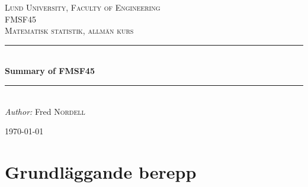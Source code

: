 \documentclass[12pt]{article} %
\begin{document}

\begin{titlepage}

\newcommand{\HRule}{\rule{\linewidth}{0.5mm}} %

\center %

\textsc{\LARGE Lund University, Faculty of Engineering}\\[1.5cm] %
\textsc{\Large FMSF45}\\[0.5cm] %
\textsc{\large Matematisk statistik, allmän kurs}\\[0.5cm] %

\HRule \\[1cm]
{ \huge \bfseries Summary of FMSF45}\\[0.4cm] %
\HRule \\[1.5cm]

\emph{Author:} Fred \textsc{Nordell} %

{\large \today}\\[3cm] %


\vfill %

\end{titlepage}


\tableofcontents %
\lstlistoflistings %
\listoffigures %
\listoftables %

\newpage %


\section{Grundläggande berepp} %
\end{document}
